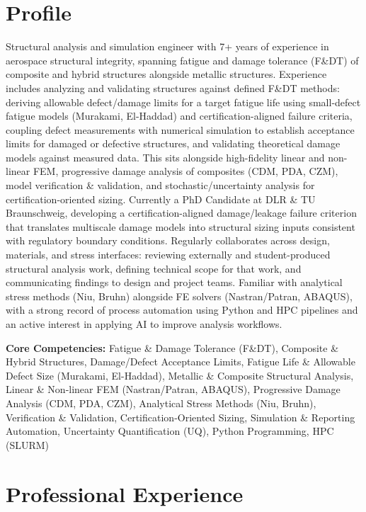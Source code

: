 \documentclass[a4paper,20pt]{article}
\begin{document}
\section{\color{blue}Profile}
Structural analysis and simulation engineer with 7+ years of experience in aerospace structural integrity, spanning fatigue and damage tolerance (F\&DT) of composite and hybrid structures alongside metallic structures. Experience includes analyzing and validating structures against defined F\&DT methods: deriving allowable defect/damage limits for a target fatigue life using small-defect fatigue models (Murakami, El-Haddad) and certification-aligned failure criteria, coupling defect measurements with numerical simulation to establish acceptance limits for damaged or defective structures, and validating theoretical damage models against measured data. This sits alongside high-fidelity linear and non-linear FEM, progressive damage analysis of composites (CDM, PDA, CZM), model verification \& validation, and stochastic/uncertainty analysis for certification-oriented sizing. Currently a PhD Candidate at DLR \& TU Braunschweig, developing a certification-aligned damage/leakage failure criterion that translates multiscale damage models into structural sizing inputs consistent with regulatory boundary conditions. Regularly collaborates across design, materials, and stress interfaces: reviewing externally and student-produced structural analysis work, defining technical scope for that work, and communicating findings to design and project teams. Familiar with analytical stress methods (Niu, Bruhn) alongside FE solvers (Nastran/Patran, ABAQUS), with a strong record of process automation using Python and HPC pipelines and an active interest in applying AI to improve analysis workflows.

\vspace{0.2cm}
\textbf{Core Competencies:} Fatigue \& Damage Tolerance (F\&DT), Composite \& Hybrid Structures, Damage/Defect Acceptance Limits, Fatigue Life \& Allowable Defect Size (Murakami, El-Haddad), Metallic \& Composite Structural Analysis, Linear \& Non-linear FEM (Nastran/Patran, ABAQUS), Progressive Damage Analysis (CDM, PDA, CZM), Analytical Stress Methods (Niu, Bruhn), Verification \& Validation, Certification-Oriented Sizing, Simulation \& Reporting Automation, Uncertainty Quantification (UQ), Python Programming, HPC (SLURM)



\section{\color{blue}Professional Experience}
\end{document}
